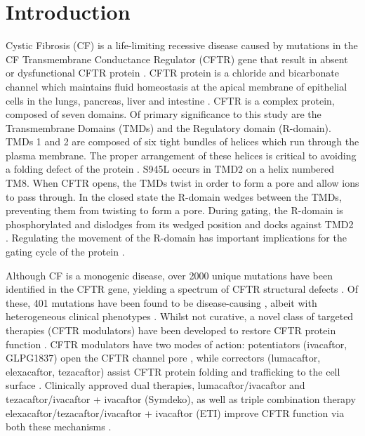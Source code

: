 \section{Introduction}
Cystic Fibrosis (CF) is a life-limiting recessive disease \cite{mall2014, elborn2016} caused by mutations in the CF Transmembrane Conductance Regulator (CFTR) gene that result in absent or dysfunctional CFTR protein \cite{rowe2005}. CFTR protein is a chloride and bicarbonate channel \cite{veit2016} which maintains fluid homeostasis at the apical membrane of epithelial cells\cite{riordan1989} in the lungs, pancreas, liver and intestine \cite{ratjen2015}. CFTR is a complex protein, composed of seven domains. Of primary significance to this study are the Transmembrane Domains (TMDs) and the Regulatory domain (R-domain). TMDs 1 and 2 are composed of six tight bundles of helices which run through the plasma membrane. The proper arrangement of these helices is critical to avoiding a folding defect of the protein \cite{fiedorczuk2022}. S945L occurs in TMD2 on a helix numbered TM8. When CFTR opens, the TMDs twist in order to form a pore and allow ions to pass through. In the closed state the R-domain wedges between the TMDs, preventing them from twisting to form a pore. During gating, the R-domain is phosphorylated and dislodges from its wedged position and docks against TMD2 \cite{zhang2018}. Regulating the movement of the R-domain has important implications for the gating cycle of the protein \cite{mihalyi2020}.

Although CF is a monogenic disease, over 2000 unique mutations have been identified in the CFTR gene, yielding a spectrum of CFTR structural defects \cite{deboeck2016}. Of these, 401 mutations have been found to be disease-causing \cite{cftr2}, albeit with heterogeneous clinical phenotypes \cite{bonadia2014}. Whilst not curative, a novel class of targeted therapies (CFTR modulators) have been developed to restore CFTR protein function \cite{awatade2018}. CFTR modulators have two modes of action:  potentiators (ivacaftor, GLPG1837) open the CFTR channel pore \cite{vangoor2009, accurso2010, yu2012, rosenfeld2018}, while correctors (lumacaftor, elexacaftor, tezacaftor) assist CFTR protein folding and trafficking to the cell surface \cite{lopes-pacheco2017, dekkers2016b}. Clinically approved dual therapies, lumacaftor/ivacaftor and tezacaftor/ivacaftor + ivacaftor (Symdeko), as well as triple combination therapy elexacaftor/tezacaftor/ivacaftor + ivacaftor (ETI) improve CFTR function via both these mechanisms \cite{ wainwright2015,rowe2017, middleton2019}. 

